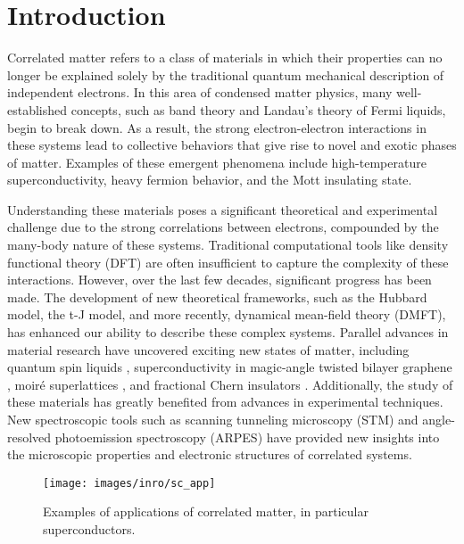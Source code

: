 \cleardoublepage
\chapter*{Introduction}


Correlated matter refers to a class of materials in which their properties can no longer be explained solely by the traditional quantum mechanical description of independent electrons.
In this area of condensed matter physics, many well-established concepts, such as band theory \cite{bethe_theorie_1928,sommerfeld_zur_1928,bloch_bemerkung_1929} and Landau’s theory of Fermi liquids, begin to break down.
As a result, the strong electron-electron interactions in these systems lead to collective behaviors that give rise to novel and exotic phases of matter.
Examples of these emergent phenomena include high-temperature superconductivity, heavy fermion behavior, and the Mott insulating state.

Understanding these materials poses a significant theoretical and experimental challenge due to the strong correlations between electrons, compounded by the many-body nature of these systems.
Traditional computational tools like density functional theory (DFT) are often insufficient to capture the complexity of these interactions.
However, over the last few decades, significant progress has been made.
The development of new theoretical frameworks, such as the Hubbard model, the t-J model, and more recently, dynamical mean-field theory (DMFT), has enhanced our ability to describe these complex systems.
Parallel advances in material research have uncovered exciting new states of matter, including quantum spin liquids \cite{broholm_quantum_2020}, superconductivity in magic-angle twisted bilayer graphene \cite{oh_evidence_2021}, moiré superlattices \cite{andrei_marvels_2021}, and fractional Chern insulators \cite{zeng_thermodynamic_2023}.
Additionally, the study of these materials has greatly benefited from advances in experimental techniques.
New spectroscopic tools such as scanning tunneling microscopy (STM) and angle-resolved photoemission spectroscopy (ARPES) have provided new insights into the microscopic properties and electronic structures of correlated systems.
\begin{figure}
	\centering
	\texttt{[image: images/inro/sc\_app]}
	\caption{Examples of applications of correlated matter, in particular superconductors.}
	\label{fig:scapp}
\end{figure}

